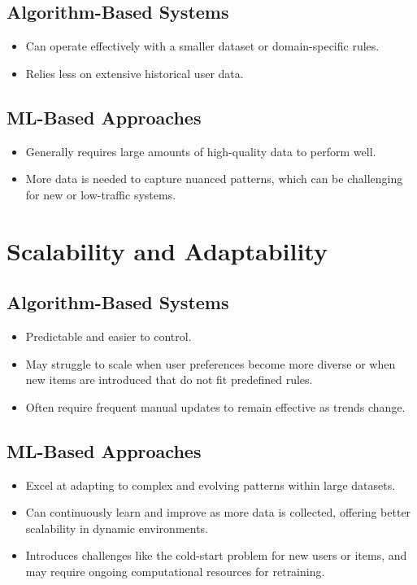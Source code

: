 \documentclass{article}
\begin{document}
\subsection{Algorithm-Based Systems}
\begin{itemize}
    \item Can operate effectively with a smaller dataset or domain-specific rules.
    \item Relies less on extensive historical user data.
\end{itemize}

\subsection{ML-Based Approaches}
\begin{itemize}
    \item Generally requires large amounts of high-quality data to perform well.
    \item More data is needed to capture nuanced patterns, which can be challenging for new or low-traffic systems.
\end{itemize}

\section{Scalability and Adaptability}
\subsection{Algorithm-Based Systems}
\begin{itemize}
    \item Predictable and easier to control.
    \item May struggle to scale when user preferences become more diverse or when new items are introduced that do not fit predefined rules.
    \item Often require frequent manual updates to remain effective as trends change.
\end{itemize}

\subsection{ML-Based Approaches}
\begin{itemize}
    \item Excel at adapting to complex and evolving patterns within large datasets.
    \item Can continuously learn and improve as more data is collected, offering better scalability in dynamic environments.
    \item Introduces challenges like the cold-start problem for new users or items, and may require ongoing computational resources for retraining.
\end{itemize}
\end{document}
